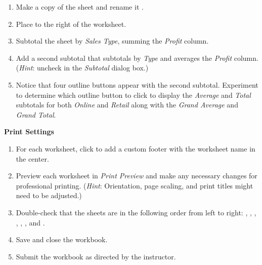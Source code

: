 \begin{enumerate}[resume]
	\item Make a copy of the  sheet and rename it . 
	\item Place  to the right of the  worksheet. 
	\item Subtotal the sheet by \textit{Sales Type}, summing the \textit{Profit} column.
	\item Add a second subtotal that subtotals by \textit{Type} and averages the \textit{Profit} column. (\textit{Hint}: uncheck  in the \textit{Subtotal} dialog box.) 
	\item Notice that four outline buttons appear with the second subtotal. Experiment to determine which outline button to click to display the \textit{Average} and \textit{Total} subtotals for both \textit{Online} and \textit{Retail} along with the \textit{Grand Average} and \textit{Grand Total}.
\end{enumerate}

\noindent
\textbf{Print Settings}

\begin{enumerate}[resume]
	\item For each worksheet, click  to add a custom footer with the worksheet name in the center.
	\item Preview each worksheet in \textit{Print Preview} and make any necessary changes for professional printing. (\textit{Hint}: Orientation, page scaling, and print titles might need to be adjusted.)
	\item Double-check that the sheets are in the following order from left to right: , , , , , , and .
	\item Save and close the  workbook.
	\item Submit the  workbook as directed by the instructor.
\end{enumerate}
